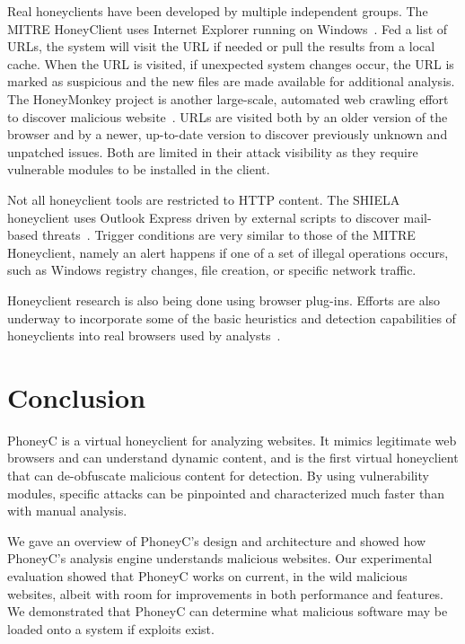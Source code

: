 \documentclass[10pt,twocolumn]{article}
\begin{document}
Real honeyclients have been developed by multiple independent groups. The MITRE HoneyClient uses Internet Explorer running on Windows~\cite{wang2005uhd}. Fed a list of URLs, the system will visit the URL if needed or pull the results from a local cache. When the URL is visited, if unexpected system changes occur, the URL is marked as suspicious and the new files are made available for additional analysis. The HoneyMonkey project is another large-scale, automated web crawling effort to discover malicious website~\cite{wang2006awp}. URLs are visited both by an older version of the browser and by a newer, up-to-date version to discover previously unknown and unpatched issues. Both are limited in their attack visibility as they require vulnerable modules to be installed in the client.

Not all honeyclient tools are restricted to HTTP content. The SHIELA honeyclient uses Outlook Express driven by external scripts to discover mail-based threats~\cite{rocaspana:sch}. Trigger conditions are very similar to those of the MITRE Honeyclient, namely an alert happens if one of a set of illegal operations occurs, such as Windows registry changes, file creation, or specific network traffic. 

Honeyclient research is also being done using browser plug-ins. Efforts are also underway to incorporate some of the basic heuristics and detection capabilities of honeyclients into real browsers used by analysts~\cite{hallaraker2005dmj}. 

\section{Conclusion}
\label{conclusion}

PhoneyC is a virtual honeyclient for analyzing websites. It mimics legitimate web browsers and can understand dynamic content, and is the first virtual honeyclient that can de-obfuscate malicious content for detection. By using vulnerability modules, specific attacks can be pinpointed and characterized much faster than with manual analysis. 

We gave an overview of PhoneyC's design and architecture and showed how PhoneyC's analysis engine understands malicious websites. Our experimental evaluation showed that PhoneyC works on current, in the wild malicious websites, albeit with room for improvements in both performance and features. We demonstrated that PhoneyC can determine what malicious software may be loaded onto a system if exploits exist. 
\end{document}
